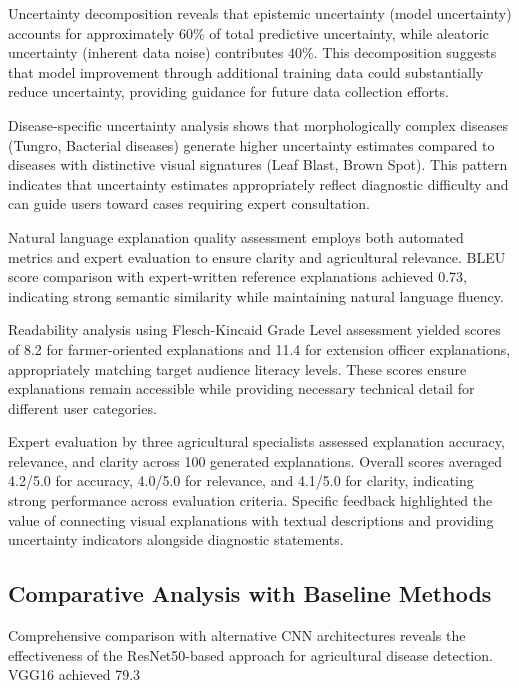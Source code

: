 \documentclass[agriculture,article,submit,pdftex,moreauthors]{Definitions/mdpi}
\begin{document}
Uncertainty decomposition reveals that epistemic uncertainty (model uncertainty) accounts for approximately $60\%$ of total predictive uncertainty, while aleatoric uncertainty (inherent data noise) contributes $40\%$. This decomposition suggests that model improvement through additional training data could substantially reduce uncertainty, providing guidance for future data collection efforts.

Disease-specific uncertainty analysis shows that morphologically complex diseases (Tungro, Bacterial diseases) generate higher uncertainty estimates compared to diseases with distinctive visual signatures (Leaf Blast, Brown Spot). This pattern indicates that uncertainty estimates appropriately reflect diagnostic difficulty and can guide users toward cases requiring expert consultation.


Natural language explanation quality assessment employs both automated metrics and expert evaluation to ensure clarity and agricultural relevance. BLEU score comparison with expert-written reference explanations achieved 0.73, indicating strong semantic similarity while maintaining natural language fluency.

Readability analysis using Flesch-Kincaid Grade Level assessment yielded scores of 8.2 for farmer-oriented explanations and 11.4 for extension officer explanations, appropriately matching target audience literacy levels. These scores ensure explanations remain accessible while providing necessary technical detail for different user categories.

Expert evaluation by three agricultural specialists assessed explanation accuracy, relevance, and clarity across 100 generated explanations. Overall scores averaged 4.2/5.0 for accuracy, 4.0/5.0 for relevance, and 4.1/5.0 for clarity, indicating strong performance across evaluation criteria. Specific feedback highlighted the value of connecting visual explanations with textual descriptions and providing uncertainty indicators alongside diagnostic statements.

\subsection{Comparative Analysis with Baseline Methods}


Comprehensive comparison with alternative CNN architectures reveals the effectiveness of the ResNet50-based approach for agricultural disease detection. VGG16 achieved 79.3%
\end{document}

